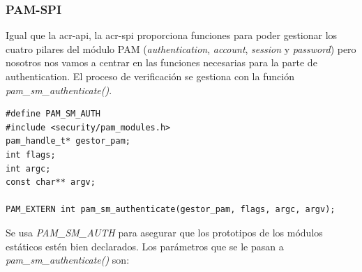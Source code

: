 \documentclass[titlepage, 12pt, a4paper]{article}
\begin{document}
\subsubsection{PAM-SPI}
Igual que la \gls{acr-api}, la \gls{acr-spi} proporciona funciones para poder gestionar los cuatro pilares del módulo PAM (\textit{authentication}, \textit{account}, \textit{session} y \textit{password}) pero nosotros nos vamos a centrar en las funciones necesarias para la parte de \gls{authentication}. El proceso de verificación se gestiona con la función \textit{pam\_sm\_authenticate()}.
\begin{lstlisting}
#define PAM_SM_AUTH
#include <security/pam_modules.h>
pam_handle_t* gestor_pam;
int flags;
int argc;
const char** argv;

PAM_EXTERN int pam_sm_authenticate(gestor_pam, flags, argc, argv);
\end{lstlisting}
Se usa \textit{PAM\_SM\_AUTH} para asegurar que los prototipos de los módulos estáticos estén bien declarados.
Los parámetros que se le pasan a \textit{pam\_sm\_authenticate()} son: 
\end{document}
